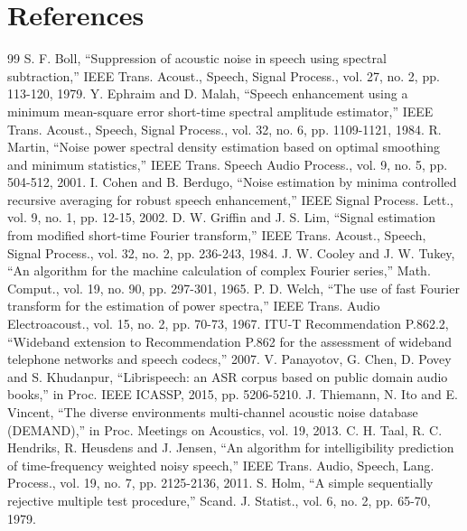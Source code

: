 \documentclass[11pt,a4paper]{article}
\numberwithin{figure}{section}
\numberwithin{table}{section}
\numberwithin{equation}{section}
\begin{document}
\section{References}
{\renewcommand{\section}[2]{}\small
\begin{thebibliography}{99}
 S. F. Boll, ``Suppression of acoustic noise in speech using spectral subtraction,'' IEEE Trans. Acoust., Speech, Signal Process., vol. 27, no. 2, pp. 113-120, 1979.
 Y. Ephraim and D. Malah, ``Speech enhancement using a minimum mean-square error short-time spectral amplitude estimator,'' IEEE Trans. Acoust., Speech, Signal Process., vol. 32, no. 6, pp. 1109-1121, 1984.
 R. Martin, ``Noise power spectral density estimation based on optimal smoothing and minimum statistics,'' IEEE Trans. Speech Audio Process., vol. 9, no. 5, pp. 504-512, 2001.
 I. Cohen and B. Berdugo, ``Noise estimation by minima controlled recursive averaging for robust speech enhancement,'' IEEE Signal Process. Lett., vol. 9, no. 1, pp. 12-15, 2002.
 D. W. Griffin and J. S. Lim, ``Signal estimation from modified short-time Fourier transform,'' IEEE Trans. Acoust., Speech, Signal Process., vol. 32, no. 2, pp. 236-243, 1984.
 J. W. Cooley and J. W. Tukey, ``An algorithm for the machine calculation of complex Fourier series,'' Math. Comput., vol. 19, no. 90, pp. 297-301, 1965.
 P. D. Welch, ``The use of fast Fourier transform for the estimation of power spectra,'' IEEE Trans. Audio Electroacoust., vol. 15, no. 2, pp. 70-73, 1967.
 ITU-T Recommendation P.862.2, ``Wideband extension to Recommendation P.862 for the assessment of wideband telephone networks and speech codecs,'' 2007.
 V. Panayotov, G. Chen, D. Povey and S. Khudanpur, ``Librispeech: an ASR corpus based on public domain audio books,'' in Proc. IEEE ICASSP, 2015, pp. 5206-5210.
 J. Thiemann, N. Ito and E. Vincent, ``The diverse environments multi-channel acoustic noise database (DEMAND),'' in Proc. Meetings on Acoustics, vol. 19, 2013.
 C. H. Taal, R. C. Hendriks, R. Heusdens and J. Jensen, ``An algorithm for intelligibility prediction of time-frequency weighted noisy speech,'' IEEE Trans. Audio, Speech, Lang. Process., vol. 19, no. 7, pp. 2125-2136, 2011.
 S. Holm, ``A simple sequentially rejective multiple test procedure,'' Scand. J. Statist., vol. 6, no. 2, pp. 65-70, 1979.
\end{thebibliography}}
\end{document}
